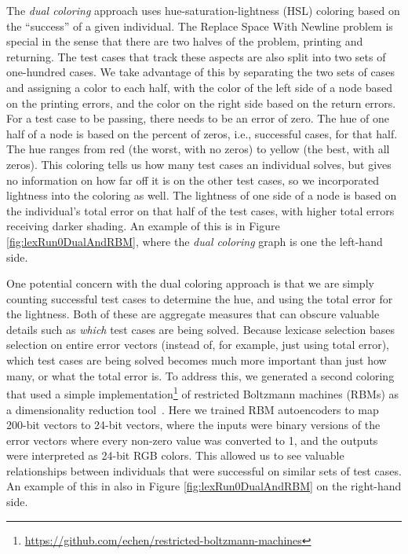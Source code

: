 \documentclass{sig-alternate}
\begin{document}
The \emph{dual coloring} approach uses hue-saturation-lightness (HSL) coloring
based on the ``success'' of a given individual. 
The Replace Space With Newline problem is special in the sense that there are 
two halves of the problem, printing and returning. The test cases that track 
these aspects are also split into two sets of one-hundred cases. We take 
advantage of this by separating the two sets of cases and assigning a color 
to each half, with the color of the left side of a node based on the
printing errors, and the color on the right side based on the return errors.
For a test case to be passing, there needs to be an error of zero. 
The hue of one half of a node is based on the percent of zeros, i.e., 
successful cases, for that half. The hue ranges from red (the worst, with no zeros) to yellow (the best, with all zeros). This coloring tells us how many test cases an individual solves, but gives no information on how far off it is on the other test cases, so we incorporated lightness into the coloring as well. The lightness of one side of a node is based on the individual's total error on that half of the test cases, with higher total errors receiving darker shading. An example of this is in Figure \ref{fig:lexRun0DualAndRBM}, where the \textit{dual coloring} graph is one the left-hand side.

One potential concern with the dual coloring approach is that we are simply 
counting successful test cases to determine the hue, and using the total
error for the lightness. Both of these are aggregate measures that can obscure
valuable details such as \emph{which} test cases are being solved. Because
lexicase selection bases selection on entire error vectors (instead of, for example,
just using total error), which test cases are being solved becomes much more
important than just how many, or what the total error is. To address this, we
generated a second coloring that used a simple 
implementation\footnote{\url{https://github.com/echen/restricted-boltzmann-machines}} 
of restricted Boltzmann machines (RBMs) as a dimensionality reduction 
tool~\cite{hinton2006reducing}. Here we trained RBM autoencoders to map 200-bit
vectors to 24-bit vectors, where the inputs were binary versions of the error
vectors where every non-zero value was converted to 1, and the outputs were
interpreted as 24-bit RGB colors. This allowed us to see valuable relationships
between individuals that were successful on similar sets of test cases. An example of this in also in Figure \ref{fig:lexRun0DualAndRBM} on the right-hand side.
\end{document}
